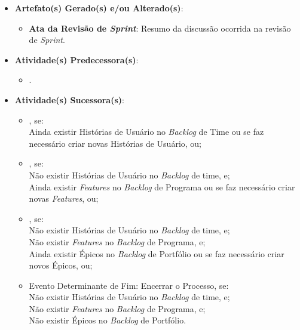 \begin{itemize}
{\begin{itemize}
						\end{itemize}}
					\item{\textbf{Artefato(s) Gerado(s) e/ou Alterado(s)}:
						\begin{itemize}
							\item{\textbf{Ata da Revisão de \emph{Sprint}}: Resumo da discussão ocorrida na revisão de \emph{Sprint}.}
						\end{itemize}}
					\item{\textbf{Atividade(s) Predecessora(s)}:
						\begin{itemize}
							\item{.}
						\end{itemize}}
					\item{\textbf{Atividade(s) Sucessora(s)}:
						\begin{itemize}
							\item{, se:
								\\ Ainda existir Histórias de Usuário no \emph{Backlog} de Time ou se faz necessário criar novas Histórias de Usuário, ou;}
							\item{, se:
								\\ Não existir Histórias de Usuário no \emph{Backlog} de time, e;
								\\ Ainda existir \emph{Features} no \emph{Backlog} de Programa ou se faz necessário criar novas \emph{Features}, ou;}
							\item{, se:
								\\ Não existir Histórias de Usuário no \emph{Backlog} de time, e;
								\\ Não existir \emph{Features} no \emph{Backlog} de Programa, e;
								\\ Ainda existir Épicos no \emph{Backlog} de Portfólio ou se faz necessário criar novos Épicos, ou;}
							\item{Evento Determinante de Fim: Encerrar o Processo, se:
								\\ Não existir Histórias de Usuário no \emph{Backlog} de time, e;
								\\ Não existir \emph{Features} no \emph{Backlog} de Programa, e;
								\\ Não existir Épicos no \emph{Backlog} de Portfólio.}
						\end{itemize}}
				\end{itemize}


